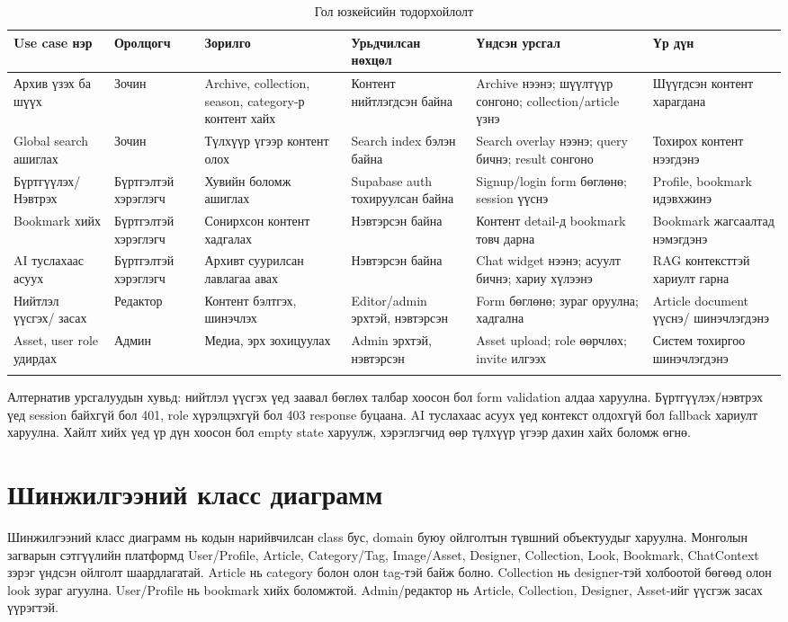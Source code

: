 {\scriptsize
\begin{longtable}{|L{0.13\textwidth}|L{0.10\textwidth}|L{0.13\textwidth}|L{0.12\textwidth}|L{0.18\textwidth}|L{0.12\textwidth}|}
  \hline
  \textbf{Use case нэр} & \textbf{Оролцогч} & \textbf{Зорилго} & \textbf{Урьдчилсан нөхцөл} & \textbf{Үндсэн урсгал} & \textbf{Үр дүн} \\ \hline
  Архив үзэх ба шүүх & Зочин & Archive, collection, season, category-р контент хайх & Контент нийтлэгдсэн байна & Archive нээнэ; шүүлтүүр сонгоно; collection/article үзнэ & Шүүгдсэн контент харагдана \\ \hline
  Global search ашиглах & Зочин & Түлхүүр үгээр контент олох & Search index бэлэн байна & Search overlay нээнэ; query бичнэ; result сонгоно & Тохирох контент нээгдэнэ \\ \hline
  Бүртгүүлэх/ Нэвтрэх & Бүртгэлтэй хэрэглэгч & Хувийн боломж ашиглах & Supabase auth тохируулсан байна & Signup/login form бөглөнө; session үүснэ & Profile, bookmark идэвхжинэ \\ \hline
  Bookmark хийх & Бүртгэлтэй хэрэглэгч & Сонирхсон контент хадгалах & Нэвтэрсэн байна & Контент detail-д bookmark товч дарна & Bookmark жагсаалтад нэмэгдэнэ \\ \hline
  AI туслахаас асуух & Бүртгэлтэй хэрэглэгч & Архивт суурилсан лавлагаа авах & Нэвтэрсэн байна & Chat widget нээнэ; асуулт бичнэ; хариу хүлээнэ & RAG контексттэй хариулт гарна \\ \hline
  Нийтлэл үүсгэх/ засах & Редактор & Контент бэлтгэх, шинэчлэх & Editor/admin эрхтэй, нэвтэрсэн & Form бөглөнө; зураг оруулна; хадгална & Article document үүснэ/ шинэчлэгдэнэ \\ \hline
  Asset, user role удирдах & Админ & Медиа, эрх зохицуулах & Admin эрхтэй, нэвтэрсэн & Asset upload; role өөрчлөх; invite илгээх & Систем тохиргоо шинэчлэгдэнэ \\ \hline
  \caption{Гол юзкейсийн тодорхойлолт}
  \label{tab:usecase-definitions-ch2}\\
\end{longtable}
}

Алтернатив урсгалуудын хувьд: нийтлэл үүсгэх үед заавал бөглөх талбар хоосон бол form validation алдаа харуулна. Бүртгүүлэх/нэвтрэх үед session байхгүй бол 401, role хүрэлцэхгүй бол 403 response буцаана. AI туслахаас асуух үед контекст олдохгүй бол fallback хариулт харуулна. Хайлт хийх үед үр дүн хоосон бол empty state харуулж, хэрэглэгчид өөр түлхүүр үгээр дахин хайх боломж өгнө.

\section{Шинжилгээний класс диаграмм}
Шинжилгээний класс диаграмм нь кодын нарийвчилсан class бус, domain буюу ойлголтын түвшний объектуудыг харуулна. Монголын загварын сэтгүүлийн платформд User/Profile, Article, Category/Tag, Image/Asset, Designer, Collection, Look, Bookmark, ChatContext зэрэг үндсэн ойлголт шаардлагатай. Article нь category болон олон tag-тэй байж болно. Collection нь designer-тэй холбоотой бөгөөд олон look зураг агуулна. User/Profile нь bookmark хийх боломжтой. Admin/редактор нь Article, Collection, Designer, Asset-ийг үүсгэж засах үүрэгтэй.

